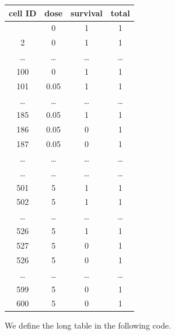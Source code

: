 \documentclass[
]{book}
\begin{document}
\begin{longtable}[]{@{}cccc@{}}
\toprule\noalign{}
cell ID & dose & survival & total \\
\midrule\noalign{}
\endhead
\bottomrule\noalign{}
\endlastfoot
1 & 0 & 1 & 1 \\
2 & 0 & 1 & 1 \\
\ldots{} & \ldots{} & \ldots{} & \ldots{} \\
100 & 0 & 1 & 1 \\
101 & 0.05 & 1 & 1 \\
\ldots{} & \ldots{} & \ldots{} & \ldots{} \\
185 & 0.05 & 1 & 1 \\
186 & 0.05 & 0 & 1 \\
187 & 0.05 & 0 & 1 \\
\ldots{} & \ldots{} & \ldots{} & \ldots{} \\
\ldots{} & \ldots{} & \ldots{} & \ldots{} \\
501 & 5 & 1 & 1 \\
502 & 5 & 1 & 1 \\
\ldots{} & \ldots{} & \ldots{} & \ldots{} \\
526 & 5 & 1 & 1 \\
527 & 5 & 0 & 1 \\
526 & 5 & 0 & 1 \\
\ldots{} & \ldots{} & \ldots{} & \ldots{} \\
599 & 5 & 0 & 1 \\
600 & 5 & 0 & 1 \\
\end{longtable}

We define the long table in the following code.
\end{document}
